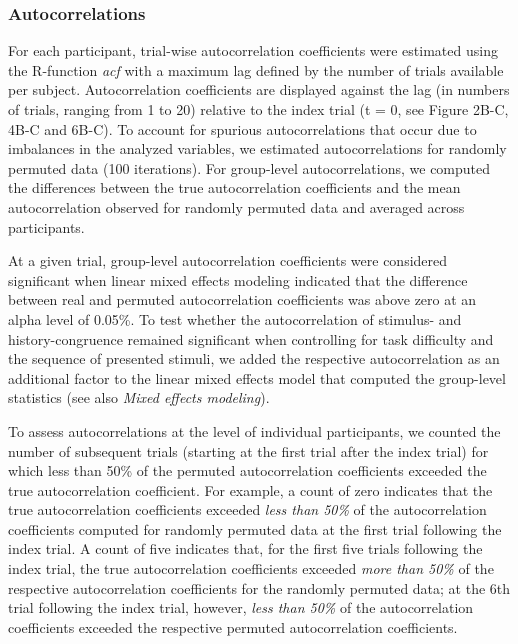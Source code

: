 \documentclass[
]{article}
\begin{document}
\hypertarget{autocorrelations}{%
\subsubsection{Autocorrelations}\label{autocorrelations}}

For each participant, trial-wise autocorrelation coefficients were
estimated using the R-function \emph{acf} with a maximum lag defined by
the number of trials available per subject. Autocorrelation coefficients
are displayed against the lag (in numbers of trials, ranging from 1 to
20) relative to the index trial (t = 0, see Figure 2B-C, 4B-C and 6B-C).
To account for spurious autocorrelations that occur due to imbalances in
the analyzed variables, we estimated autocorrelations for randomly
permuted data (100 iterations). For group-level autocorrelations, we
computed the differences between the true autocorrelation coefficients
and the mean autocorrelation observed for randomly permuted data and
averaged across participants.

At a given trial, group-level autocorrelation coefficients were
considered significant when linear mixed effects modeling indicated that
the difference between real and permuted autocorrelation coefficients
was above zero at an alpha level of 0.05\%. To test whether the
autocorrelation of stimulus- and history-congruence remained significant
when controlling for task difficulty and the sequence of presented
stimuli, we added the respective autocorrelation as an additional factor
to the linear mixed effects model that computed the group-level
statistics (see also \emph{Mixed effects modeling}).

To assess autocorrelations at the level of individual participants, we
counted the number of subsequent trials (starting at the first trial
after the index trial) for which less than 50\% of the permuted
autocorrelation coefficients exceeded the true autocorrelation
coefficient. For example, a count of zero indicates that the true
autocorrelation coefficients exceeded \emph{less than 50\%} of the
autocorrelation coefficients computed for randomly permuted data at the
first trial following the index trial. A count of five indicates that,
for the first five trials following the index trial, the true
autocorrelation coefficients exceeded \emph{more than 50\%} of the
respective autocorrelation coefficients for the randomly permuted data;
at the 6th trial following the index trial, however, \emph{less than
50\%} of the autocorrelation coefficients exceeded the respective
permuted autocorrelation coefficients.
\end{document}
